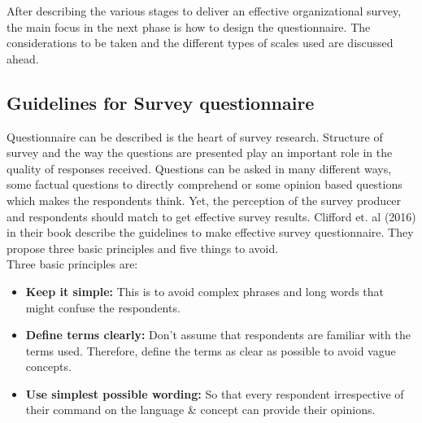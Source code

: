 After describing the various stages to deliver an effective organizational survey, the main focus in the next phase is how to design the questionnaire. The considerations to be taken and the different types of scales used are discussed ahead.\\


\subsection{Guidelines for Survey questionnaire}
Questionnaire can be described is the heart of survey research. Structure of survey and the way the questions are presented play an important role in the quality of responses received. Questions can be asked in many different ways, some factual questions to directly comprehend or some opinion based questions which makes the respondents think. Yet, the perception of the survey producer and respondents should match to get effective survey results. Clifford et. al (2016) in their book describe the guidelines to make effective survey questionnaire. They propose three basic principles and five things to avoid.\\

Three basic principles are:\\
\begin{itemize}
    \item \textbf{Keep it simple:} This is to avoid complex phrases and long words that might confuse the respondents.\\
    \item \textbf{Define terms clearly:} Don't assume that respondents are familiar with the terms used. Therefore, define the terms as clear as possible to avoid vague concepts.\\
    \item \textbf{Use simplest possible wording:} So that every respondent irrespective of their command on the language & concept can provide their opinions.\\

\end{itemize}

